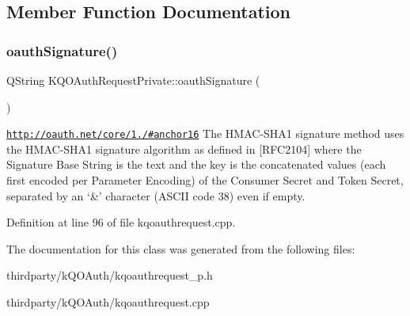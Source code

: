 \subsection{Member Function Documentation}
\mbox{\label{class_k_q_o_auth_request_private_a8e6c6a907d86eec00365e3ef40a33e9e}} 
\subsubsection{\texorpdfstring{oauth\+Signature()}{oauthSignature()}}
{\footnotesize\ttfamily Q\+String K\+Q\+O\+Auth\+Request\+Private\+::oauth\+Signature (\begin{DoxyParamCaption}{ }\end{DoxyParamCaption})}

\href{http://oauth.net/core/1.0/#anchor16}{\tt http\+://oauth.\+net/core/1./\#anchor16} The H\+M\+A\+C-\/\+S\+H\+A1 signature method uses the H\+M\+A\+C-\/\+S\+H\+A1 signature algorithm as defined in \mbox{[}R\+F\+C2104\mbox{]} where the Signature Base String is the text and the key is the concatenated values (each first encoded per Parameter Encoding) of the Consumer Secret and Token Secret, separated by an ‘\&’ character (A\+S\+C\+II code 38) even if empty.

Definition at line 96 of file kqoauthrequest.\+cpp.



The documentation for this class was generated from the following files\+:\begin{DoxyCompactItemize}
\item 
thirdparty/k\+Q\+O\+Auth/kqoauthrequest\+\_\+p.\+h\item 
thirdparty/k\+Q\+O\+Auth/kqoauthrequest.\+cpp\end{DoxyCompactItemize}
